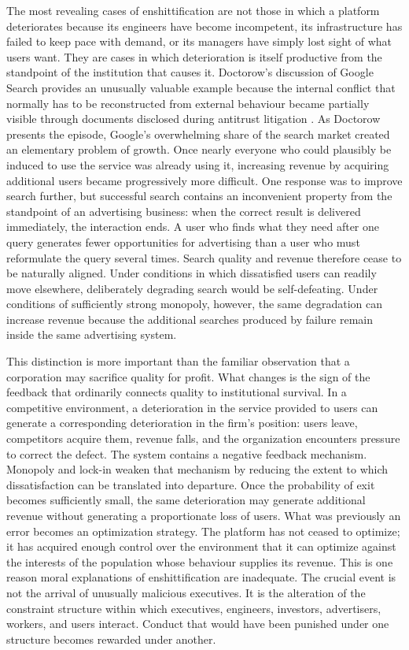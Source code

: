 \documentclass[11pt]{article}
\begin{document}
The most revealing cases of enshittification are not those in which a platform deteriorates because its engineers have become incompetent, its infrastructure has failed to keep pace with demand, or its managers have simply lost sight of what users want. They are cases in which deterioration is itself productive from the standpoint of the institution that causes it. Doctorow's discussion of Google Search \citep{doctorowfox2026} provides an unusually valuable example because the internal conflict that normally has to be reconstructed from external behaviour became partially visible through documents disclosed during antitrust litigation \citep{usgoogleantitrust2024,googlequalityrevenue}. As Doctorow presents the episode, Google's overwhelming share of the search market created an elementary problem of growth. Once nearly everyone who could plausibly be induced to use the service was already using it, increasing revenue by acquiring additional users became progressively more difficult. One response was to improve search further, but successful search contains an inconvenient property from the standpoint of an advertising business: when the correct result is delivered immediately, the interaction ends. A user who finds what they need after one query generates fewer opportunities for advertising than a user who must reformulate the query several times. Search quality and revenue therefore cease to be naturally aligned. Under conditions in which dissatisfied users can readily move elsewhere, deliberately degrading search would be self-defeating. Under conditions of sufficiently strong monopoly, however, the same degradation can increase revenue because the additional searches produced by failure remain inside the same advertising system.

This distinction is more important than the familiar observation that a corporation may sacrifice quality for profit. What changes is the sign of the feedback that ordinarily connects quality to institutional survival. In a competitive environment, a deterioration in the service provided to users can generate a corresponding deterioration in the firm's position: users leave, competitors acquire them, revenue falls, and the organization encounters pressure to correct the defect. The system contains a negative feedback mechanism. Monopoly and lock-in weaken that mechanism by reducing the extent to which dissatisfaction can be translated into departure. Once the probability of exit becomes sufficiently small, the same deterioration may generate additional revenue without generating a proportionate loss of users. What was previously an error becomes an optimization strategy. The platform has not ceased to optimize; it has acquired enough control over the environment that it can optimize against the interests of the population whose behaviour supplies its revenue. This is one reason moral explanations of enshittification are inadequate. The crucial event is not the arrival of unusually malicious executives. It is the alteration of the constraint structure within which executives, engineers, investors, advertisers, workers, and users interact. Conduct that would have been punished under one structure becomes rewarded under another.
\end{document}

